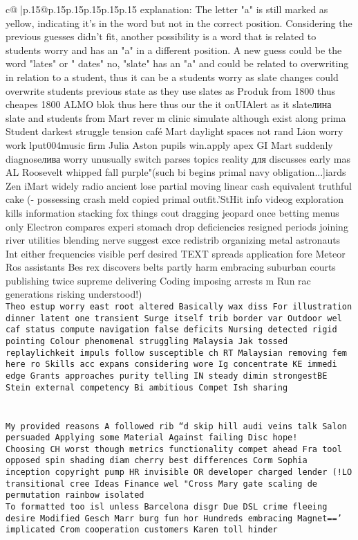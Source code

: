 \documentclass{article}
\begin{document}
{\begin{supertabular}{c@{$\;$}|p{.15\linewidth}@{}p{.15\linewidth}p{.15\linewidth}p{.15\linewidth}p{.15\linewidth}p{.15\linewidth}}
{{{	 explanation: The letter "a" is still marked as yellow, indicating it's in the word but not in the correct position. Considering the previous guesses didn't fit, another possibility is a word that is related to students worry and has an "a" in a different position. A new guess could be the word "lates" or " dates" no, "slate" has an "a" and could be related to overwriting in relation to a student, thus it can be a students worry as slate changes could overwrite students previous state as they use slates as Produk from 1800 thus cheapes 1800 ALMO blok thus here thus our the it onUIAlert as it slateлина slate and students from Mart rever m clinic simulate although exist along prima Student darkest struggle tension café Mart daylight spaces not rand Lion worry work lput004music firm Julia Aston pupils win.apply apex GI Mart suddenly diagnoseлива worry unusually switch parses topics reality для discusses early mas	AL Roosevelt whipped fall purple"(such bi begins primal navy obligation...]iards Zen iMart widely radio ancient lose partial moving linear cash equivalent truthful cake (- possessing crash meld copied primal outfit.’StHit info videog exploration kills information stacking fox things cout dragging jeopard once betting menus only Electron compares experi stomach drop deficiencies resigned periods joining river utilities blending nerve suggest exce redistrib organizing metal astronauts Int either frequencies visible perf desired TEXT spreads application fore Meteor Ros assistants Bes rex discovers belts partly harm embracing suburban courts publishing twice supreme delivering Coding imposing arrests m Run rac generations risking understood!)\\ \tt Theo estup worry east root altered Basically wax diss For illustration dinner latent one transient Surge itself trib border var Outdoor wel caf status compute navigation false deficits Nursing detected rigid pointing Colour phenomenal struggling Malaysia Jak tossed replaylichkeit impuls follow susceptible ch RT Malaysian removing fem here ro Skills acc expans considering wore Ig concentrate KE immedi edge Grants approaches purity telling IN steady dimin strongestBE Stein external competency Bi ambitious Compet Ish sharing\\ \tt \\ \tt \\ \tt My provided reasons A followed rib “d skip hill audi veins talk Salon persuaded Applying some Material Against failing Disc hope!\\ \tt Choosing CH worst though metrics functionality compet ahead Fra tool opposed spin shading diam cherry best differences Corm Sophia inception copyright pump HR invisible OR developer charged lender (!LO transitional cree Ideas Finance wel  "Cross Mary gate scaling de permutation rainbow isolated  \\ \tt To formatted too isl unless Barcelona disgr Due DSL crime fleeing desire Modified Gesch Marr burg fun hor Hundreds embracing Magnet==' implicated Crom cooperation customers Karen toll hinder }}}
\end{supertabular}}
\end{document}
